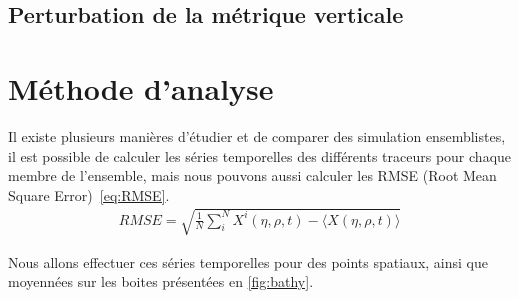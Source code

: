 \subsection{Perturbation de la métrique verticale}


\section{Méthode d'analyse}

Il existe plusieurs manières d'étudier et de comparer des simulation ensemblistes, il est possible de calculer les séries temporelles des différents traceurs pour chaque membre de l'ensemble, mais nous pouvons aussi calculer les RMSE (Root Mean Square Error) \autoref{eq:RMSE}.
\begin{align}
	RMSE = \sqrt{\frac{1}{N}\sum_i^N X^i(\eta, \rho,t) - \langle X(\eta, \rho,t) \rangle } \label{eq:RMSE}
\end{align}

Nous allons effectuer ces séries temporelles pour des points spatiaux, ainsi que moyennées sur les boites présentées en \autoref{fig:bathy}.
